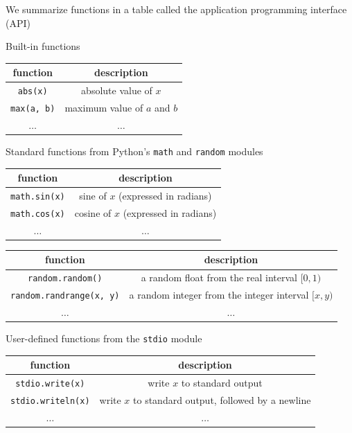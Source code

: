 \documentclass[8pt,a4paper,compress]{beamer}
\begin{document}
\begin{frame}[fragile]
\pause

We summarize functions in a table called the application programming interface (API)

\pause
\bigskip

Built-in functions

\begin{center}
\begin{tabular}{cc}
function & description \\ \hline
\lstinline$abs(x)$ & absolute value of $x$ \\
\lstinline$max(a, b)$ & maximum value of $a$ and $b$ \\
$\dots$ & $\dots$
\end{tabular} 
\end{center}

\pause
\smallskip

Standard functions from Python's \lstinline{math} and \lstinline{random} modules

\begin{center}
\begin{tabular}{cc}
function & description \\ \hline
\lstinline$math.sin(x)$ & sine of $x$ (expressed in radians) \\
\lstinline$math.cos(x)$ & cosine of $x$ (expressed in radians) \\
$\dots$ & $\dots$
\end{tabular} 

\begin{tabular}{cc}
function & description \\ \hline
\lstinline$random.random()$ & a random float from the real interval $[0, 1)$ \\
\lstinline$random.randrange(x, y)$ & a random integer from the integer interval $[x, y)$ \\
$\dots$ & $\dots$
\end{tabular} 
\end{center}

\pause
\smallskip

User-defined functions from the \lstinline{stdio} module

\begin{center}
\begin{tabular}{cc}
function & description \\ \hline
\lstinline$stdio.write(x)$ & write $x$ to standard output \\
\lstinline$stdio.writeln(x)$ & write $x$ to standard output, followed by a newline \\
$\dots$ & $\dots$
\end{tabular} 
\end{center}
\end{frame}
\end{document}
